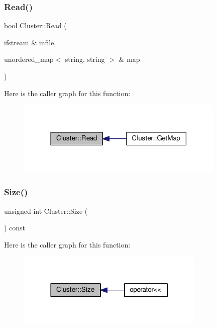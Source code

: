 \subsubsection{\texorpdfstring{Read()}{Read()}}
{\footnotesize\ttfamily bool Cluster\+::\+Read (\begin{DoxyParamCaption}\item[{ifstream \&}]{infile,  }\item[{unordered\+\_\+map$<$ string, string $>$ \&}]{map }\end{DoxyParamCaption})}

Here is the caller graph for this function\+:
\nopagebreak
\begin{figure}[H]
\begin{center}
\leavevmode
\includegraphics[width=282pt]{class_cluster_ad9132f66736e8f170eb7746f9cd482d0_icgraph}
\end{center}
\end{figure}
\mbox{\label{class_cluster_a916e731be9d3e52a404152e94b8b127d}} 
\subsubsection{\texorpdfstring{Size()}{Size()}}
{\footnotesize\ttfamily unsigned int Cluster\+::\+Size (\begin{DoxyParamCaption}{ }\end{DoxyParamCaption}) const\hspace{0.3cm}{\ttfamily [inline]}}

Here is the caller graph for this function\+:
\nopagebreak
\begin{figure}[H]
\begin{center}
\leavevmode
\includegraphics[width=254pt]{class_cluster_a916e731be9d3e52a404152e94b8b127d_icgraph}
\end{center}
\end{figure}


